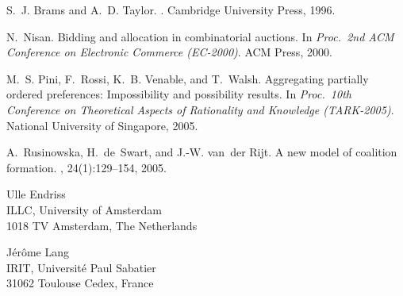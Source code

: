 \documentclass{comsoc}
\begin{document}
\begin{thebibliography}{1}

S.~J. Brams and A.~D. Taylor.
.
\newblock Cambridge University Press, 1996.

N.~Nisan.
\newblock Bidding and allocation in combinatorial auctions.
\newblock In {\em Proc.\ 2nd ACM Conference on Electronic Commerce (EC-2000)}.
  ACM Press, 2000.

M.~S. Pini, F.~Rossi, K.~B. Venable, and T.~Walsh.
\newblock Aggregating partially ordered preferences: {I}mpossibility and
  possibility results.
\newblock In {\em Proc.\ 10th Conference on Theoretical Aspects of Rationality
  and Knowledge (TARK-2005)}. National University of Singapore, 2005.

A.~Rusinowska, H.~de~Swart, and J.-W. van~der Rijt.
\newblock A new model of coalition formation.
, 24(1):129--154, 2005.

\end{thebibliography}



\begin{contact}
Ulle Endriss \\
ILLC, University of Amsterdam \\
1018 TV Amsterdam, The Netherlands \\
\end{contact}

\begin{contact}
J\'er\^ome Lang \\
IRIT, Universit\'e Paul Sabatier \\
31062 Toulouse Cedex, France \\
\end{contact}

\end{document}
